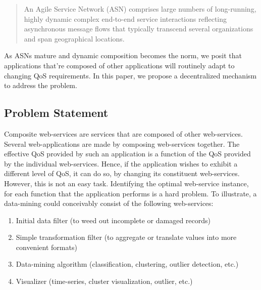 \documentclass[10pt,journal,compsoc]{IEEEtran}
\begin{document}
\begin{quote}
An Agile Service Network (ASN) comprises large numbers of long-running, highly dynamic complex end-to-end service interactions reflecting asynchronous message flows that typically transcend several organizations and span geographical locations. 
\end{quote}
As ASNs mature and dynamic composition becomes the norm, we posit that applications that're composed of other applications will routinely adapt to changing QoS requirements. In this paper, we propose a decentralized mechanism to address the problem.  
\subsection{Problem Statement}
Composite web-services are services that are composed of other web-services. Several web-applications are made by composing web-services together. The effective QoS provided by such an application is a function of the QoS provided by the individual web-services. Hence, if the application wishes to exhibit a different level of QoS, it can do so, by changing its constituent web-services. However, this is not an easy task. Identifying the optimal web-service instance, for each function that the application performs is a hard problem. To illustrate, a data-mining could conceivably consist of the following web-services:
	    \begin{enumerate}
	        \item Initial data filter (to weed out incomplete or damaged records)
		\item Simple transformation filter (to aggregate or translate values into more convenient formats)
		\item Data-mining algorithm (classification, clustering, outlier detection, etc.)
		\item Visualizer (time-series, cluster visualization, outlier, etc.)
	    \end{enumerate}
\end{document}

